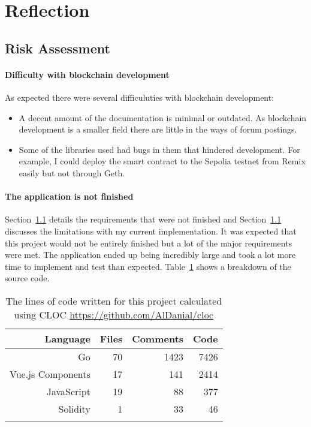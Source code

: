 \section{Reflection}

\subsection{Risk Assessment}

\paragraph*{Difficulty with blockchain development}
As expected there were several difficuluties with blockchain development:

\begin{itemize}
  \item A decent amount of the documentation is minimal or outdated. As blockchain development is a smaller field there are little in the ways of forum postings.
  \item Some of the libraries used had bugs in them that hindered development. For example, I could deploy the smart contract to the Sepolia testnet from Remix easily but not through Geth. 
\end{itemize}

\paragraph*{The application is not finished}
Section~\ref{} details the requirements that were not finished and Section~\ref{} discusses the limitations with my current implementation. It was expected that this project would not be entirely finished but a lot of the major requirements were met.
\x
The application ended up being incredibly large and took a lot more time to implement and test than expected. Table~\ref{tab:cloc} shows a breakdown of the source code.

\begin{longtable}{ | r | r | r | r | }
  \hline
  \textbf{Language} & \textbf{Files} & \textbf{Comments} & \textbf{Code}
  \\\hline
  Go
  & 70
  & 1423
  & 7426
  \\\hline
  Vue.js Components
  & 17
  & 141
  & 2414
  \\\hline
  JavaScript
  & 19
  & 88
  & 377
  \\\hline
  Solidity
  & 1
  & 33
  & 46
  \\\hline
  \caption{The lines of code written for this project calculated using CLOC \url{https://github.com/AlDanial/cloc}}
  \label{tab:cloc}
\end{longtable}

